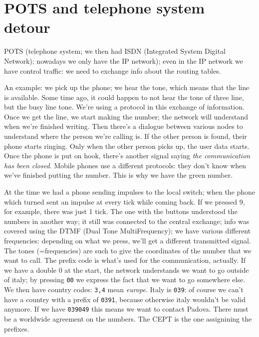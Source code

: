 \documentclass[a4paper, 12pt]{book}
\begin{document}
\section{POTS and telephone system detour}

POTS (telephone system; we then had ISDN (Integrated System Digital Network); nowadays we only have the IP network); even in the IP network we have control traffic: we need to exchange info about the routing tables.

\begin{bluebox}
An example: we pick up the phone; we hear the tone, which means that the line is available. Some time ago, it could happen to not hear the tone of three line, but the busy line tone. We're using a protocol in this exchange of information. Once we get the line, we start making the number; the network will understand when we're finished writing. Then there's a dialogue between various nodes to understand where the person we're calling is.
If the other person is found, their phone starts ringing. Only when the other person picks up, the user data starts. Once the phone is put on hook, there's another signal saying \textit{the communication has been closed}.
Mobile phones use a different protocols: they don't know when we've finished putting the number. This is why we have the green number.

\begin{greenbar}
At the time we had a phone sending impulses to the local switch; when the phone which turned sent an impulse at every tick while coming back. If we pressed 9, for example, there was just 1 tick.
The one with the buttons understood the numbers in another way; it still was connected to the central exchange; info was covered using the DTMF (Dual Tone MultiFrequency); we have various different frequencies: depending on what we press, we'll get a different transmitted signal. The tones (=frequencies) are such to give the coordinates of the number that we want to call.
The prefix code is what's used for the communication, actually. If we have a double 0 at the start, the network understands we want to go outside of italy; by pressing \texttt{00} we express the fact that we want to go somewhere else. We then have country codes: \texttt{3,4} mean \textit{europe}. Italy is \texttt{039}: of course we can't have a country with a prefix of \texttt{0391}, because otherwise italy wouldn't be valid anymore.
If we have \texttt{039049} this means we want to contact Padova.
There must be a worldwide agreement on the numbers. The CEPT is the one assignining the prefixes.
\end{greenbar}
\end{bluebox}
\end{document}
